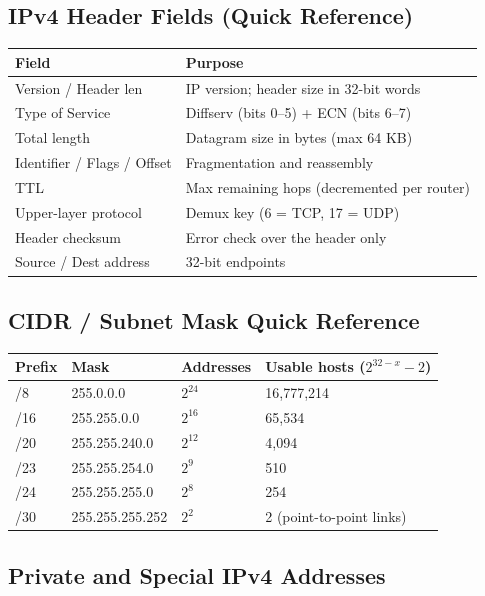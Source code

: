 \documentclass[hidelinks]{article}
\begin{document}
\subsection{IPv4 Header Fields (Quick Reference)}

\noindent\begin{tabularx}{\textwidth}{|l|X|}
\hline
\textbf{Field} & \textbf{Purpose} \\
\hline
Version / Header len & IP version; header size in 32-bit words \\
\hline
Type of Service & Diffserv (bits 0--5) + ECN (bits 6--7) \\
\hline
Total length & Datagram size in bytes (max 64 KB) \\
\hline
Identifier / Flags / Offset & Fragmentation and reassembly \\
\hline
TTL & Max remaining hops (decremented per router) \\
\hline
Upper-layer protocol & Demux key (6 = TCP, 17 = UDP) \\
\hline
Header checksum & Error check over the header only \\
\hline
Source / Dest address & 32-bit endpoints \\
\hline
\end{tabularx}

\subsection{CIDR / Subnet Mask Quick Reference}

\noindent\begin{tabularx}{\textwidth}{|l|l|l|X|}
\hline
\textbf{Prefix} & \textbf{Mask} & \textbf{Addresses} & \textbf{Usable hosts ($2^{32-x}{-}2$)} \\
\hline
/8  & 255.0.0.0       & $2^{24}$ & 16{,}777{,}214 \\
\hline
/16 & 255.255.0.0     & $2^{16}$ & 65{,}534 \\
\hline
/20 & 255.255.240.0   & $2^{12}$ & 4{,}094 \\
\hline
/23 & 255.255.254.0   & $2^{9}$  & 510 \\
\hline
/24 & 255.255.255.0   & $2^{8}$  & 254 \\
\hline
/30 & 255.255.255.252 & $2^{2}$  & 2 (point-to-point links) \\
\hline
\end{tabularx}

\subsection{Private and Special IPv4 Addresses}
\end{document}
